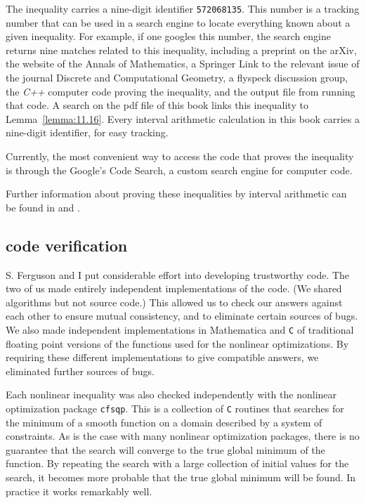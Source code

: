 The inequality carries a nine-digit identifier {\tt 572068135}.  This
number is a tracking number that can be used in a search engine to
locate everything known about a given inequality.  For example, if one
googles this number, the search engine returns nine matches related to
this inequality, including a preprint on the arXiv, the website of the
Annals of Mathematics, a Springer Link to the relevant issue of the
journal Discrete and Computational Geometry, a flyspeck discussion
group, the {\it C++} computer code proving the inequality, and the
output file from running that code.  A search on the pdf file of this
book links this inequality to Lemma~\ref{lemma:11.16}.  Every interval
arithmetic calculation in this book carries a nine-digit identifier,
for easy tracking.

Currently, the most convenient way to access the code that proves the
inequality is through the Google's Code Search, a custom search engine
for computer code.


Further information about proving these inequalities by interval
arithmetic can be found in \cite{algorithm} and \cite{part1}.

\subsection{code verification}

S. Ferguson and I put considerable effort into developing trustworthy
code.  The two of us made entirely independent implementations of
the code. %
(We shared algorithms
but not source code.)  This allowed us to check our answers against each
other to ensure mutual consistency, 
and to eliminate certain sources of bugs.  We also made independent
implementations in Mathematica and {\tt C} of traditional floating point
versions of the functions used for the nonlinear
optimizations.  By requiring these different implementations to give
compatible answers, we eliminated further sources of bugs.

Each nonlinear inequality was also checked independently with the
nonlinear optimization package {\tt cfsqp}.  This is a collection of
{\tt C} routines that searches for the minimum of a smooth function on
a domain described by a system of constraints.  As is the case with
many nonlinear optimization packages, there is no guarantee that the
search will converge to the true global minimum of the function.  By
repeating the search with a large collection of initial values for the
search, it becomes more probable that the true global minimum will be
found.  In practice it works remarkably well.

